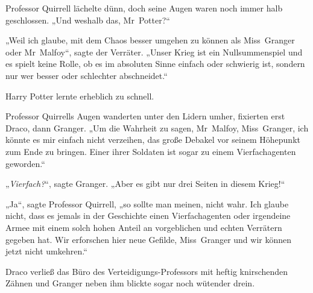 Professor Quirrell lächelte dünn, doch seine Augen waren noch immer halb geschlossen.
„Und weshalb das, Mr~Potter?“

„Weil ich glaube, mit dem Chaos besser umgehen zu können als Miss~Granger oder Mr~Malfoy“, sagte der Verräter.
„Unser Krieg ist ein Nullsummenspiel und es spielt keine Rolle, ob es im absoluten Sinne einfach oder schwierig ist, sondern nur wer besser oder schlechter abschneidet.“

Harry Potter lernte erheblich zu schnell.

Professor Quirrells Augen wanderten unter den Lidern umher, fixierten erst Draco, dann Granger.
„Um die Wahrheit zu sagen, Mr~Malfoy, Miss~Granger, ich könnte es mir einfach nicht verzeihen, das große Debakel vor seinem Höhepunkt zum Ende zu bringen. Einer ihrer Soldaten ist sogar zu einem Vierfachagenten geworden.“

„\emph{Vierfach?}“, sagte Granger.
„Aber es gibt nur drei Seiten in diesem Krieg!“

„Ja“, sagte Professor Quirrell, „so sollte man meinen, nicht wahr. Ich glaube nicht, dass es jemals in der Geschichte einen Vierfachagenten oder irgendeine Armee mit einem solch hohen Anteil an vorgeblichen und echten Verrätern gegeben hat. Wir erforschen hier neue Gefilde, Miss~Granger und wir können jetzt nicht umkehren.“

Draco verließ das Büro des Verteidigungs-Professors mit heftig knirschenden Zähnen und Granger neben ihm blickte sogar noch wütender drein.


